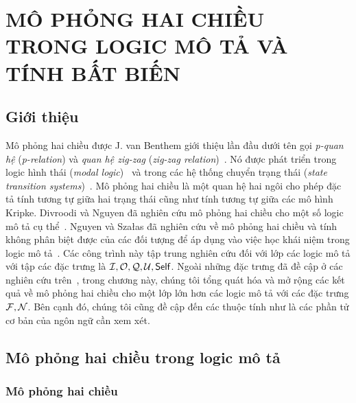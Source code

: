\chapter[Mô phỏng hai chiều trong logic mô tả và tính bất biến]{MÔ PHỎNG HAI CHIỀU TRONG LOGIC MÔ TẢ VÀ TÍNH BẤT BIẾN}
\label{Chapter2}
\thispagestyle{fancy}

\section{Giới thiệu}
\label{sec:Chap2.Introduction}
Mô phỏng hai chiều được J. van Benthem giới thiệu lần đầu dưới tên gọi {\em p-quan hệ} ({\em p-relation}) và {\em quan hệ zig-zag} ({\em zig-zag relation})~\cite{Benthem1983,Benthem1984}. Nó được phát triển trong logic hình thái ({\em modal logic})~\cite{Benthem2001,Blackburn2001,Blackburn2006,Benthem2010} và trong các hệ thống chuyển trạng thái ({\em state transition systems})~\cite{Park1981,Hennessy1985}. 
Mô phỏng hai chiều là một quan hệ hai ngôi cho phép đặc tả tính tương tự giữa hai trạng thái cũng như tính tương tự giữa các mô hình Kripke. Divroodi và Nguyen đã nghiên cứu mô phỏng hai chiều cho một số logic mô tả cụ thể~\cite{Divroodi2011B}. Nguyen và Sza{\l}as đã nghiên cứu về mô phỏng hai chiều và tính không phân biệt được của các đối tượng để áp dụng vào việc học khái niệm trong logic mô tả~\cite{Nguyen2013}. 
Các công trình này tập trung nghiên cứu đối với lớp các logic mô tả \ALCreg với tập các đặc trưng là $\mathcal{I}, \mathcal{O}, \mathcal{Q}, \mathcal{U}, \mathsf{Self}$. Ngoài những đặc trưng đã đề cập ở các nghiên cứu trên~\cite{Divroodi2011B,Nguyen2013}, trong chương này, chúng tôi tổng quát hóa và mở rộng các kết quả về mô phỏng hai chiều cho một lớp lớn hơn các logic mô tả với các đặc trưng $\mathcal{F}, \mathcal{N}$. Bên cạnh đó, chúng tôi cũng đề cập đến các thuộc tính như là các phần tử cơ bản của ngôn ngữ cần xem xét.

\section{Mô phỏng hai chiều trong logic mô tả}
\label{sec:Chap2.BisimulationInDL}
\subsection{Mô phỏng hai chiều}
\label{sec:Chap2.Bisimulation}

